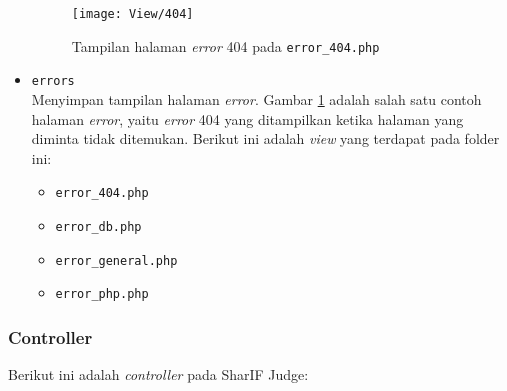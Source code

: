 \begin{itemize}
    \begin{figure}[H]
    	\centering  
    	\texttt{[image: View/404]}  
    	\caption{Tampilan halaman \textit{error} 404 pada \texttt{error\_404.php}}
    	\label{fig:3:view404} 
    \end{figure} 

	\item \verb|errors| \\ Menyimpan tampilan halaman \textit{error}. Gambar \ref{fig:3:view404} adalah salah satu contoh halaman \textit{error}, yaitu \textit{error} 404 yang ditampilkan ketika halaman yang diminta tidak ditemukan. Berikut ini adalah \textit{view} yang terdapat pada folder ini: 
    \begin{itemize}
        \item \verb|error_404.php|
        \item \verb|error_db.php|
        \item \verb|error_general.php|
        \item \verb|error_php.php|
    \end{itemize}

\end{itemize}

\subsubsection{Controller}

Berikut ini adalah \textit{controller} pada SharIF Judge:

